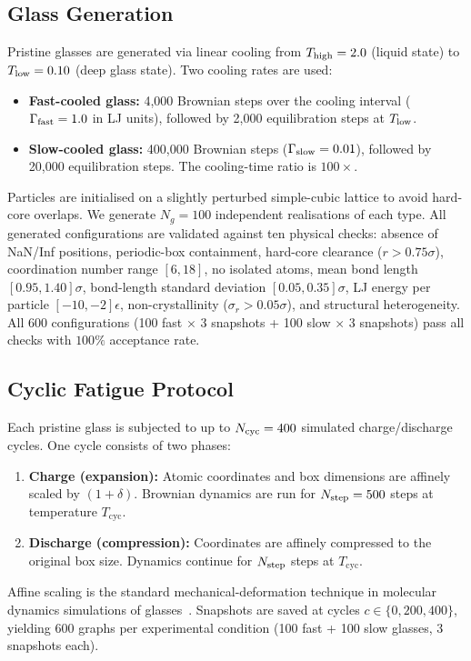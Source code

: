 \documentclass[12pt,a4paper]{article}
\newcommand{\Tbat}{T_{\mathrm{cyc}}}
\newcommand{\sigr}{\sigma_r}
\begin{document}
\subsection{Glass Generation}
\label{sec:glass-gen}

Pristine glasses are generated via linear cooling from $T_{\rm high} = 2.0$ (liquid state) to $T_{\rm low} = 0.10$ (deep glass state).
Two cooling rates are used:
\begin{itemize}
  \item \textbf{Fast-cooled glass:} 4{,}000 Brownian steps over the cooling interval ($\Gamma_{\rm fast} = 1.0$ in LJ units), followed by 2{,}000 equilibration steps at $T_{\rm low}$.
  \item \textbf{Slow-cooled glass:} 400{,}000 Brownian steps ($\Gamma_{\rm slow} = 0.01$), followed by 20{,}000 equilibration steps. The cooling-time ratio is $100\times$.
\end{itemize}
Particles are initialised on a slightly perturbed simple-cubic lattice to avoid hard-core overlaps.
We generate $N_g = 100$ independent realisations of each type.
All generated configurations are validated against ten physical checks: absence of NaN/Inf positions, periodic-box containment, hard-core clearance ($r > 0.75\sigma$), coordination number range $[6, 18]$, no isolated atoms, mean bond length $[0.95, 1.40]\sigma$, bond-length standard deviation $[0.05, 0.35]\sigma$, LJ energy per particle $[-10, -2]\epsilon$, non-crystallinity ($\sigr > 0.05\sigma$), and structural heterogeneity.
All 600 configurations (100 fast $\times$ 3 snapshots + 100 slow $\times$ 3 snapshots) pass all checks with $100\%$ acceptance rate.

\subsection{Cyclic Fatigue Protocol}
\label{sec:fatigue}

Each pristine glass is subjected to up to $N_{\rm cyc} = 400$ simulated charge/discharge cycles.
One cycle consists of two phases:
\begin{enumerate}
  \item \textbf{Charge (expansion):} Atomic coordinates and box dimensions are affinely scaled by $(1 + \delta)$. Brownian dynamics are run for $N_{\rm step} = 500$ steps at temperature $\Tbat$.
  \item \textbf{Discharge (compression):} Coordinates are affinely compressed to the original box size. Dynamics continue for $N_{\rm step}$ steps at $\Tbat$.
\end{enumerate}
Affine scaling is the standard mechanical-deformation technique in molecular dynamics simulations of glasses~\cite{Lemaitre2006,Maloney2006}.
Snapshots are saved at cycles $c \in \{0, 200, 400\}$, yielding 600 graphs per experimental condition (100 fast + 100 slow glasses, 3 snapshots each).
\end{document}
